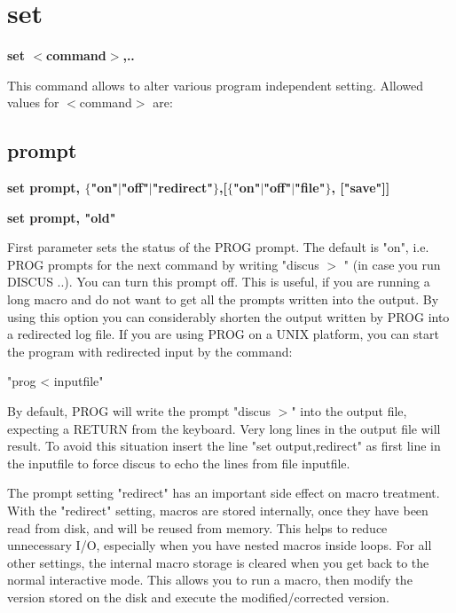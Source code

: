 \section{set}
{\bf set $ <$command$> $,.. \par }
\par
\vspace{3pt}
This command allows to alter various program independent setting. 
Allowed values for $ <$command$> $ are: 
\par
\subsection*{prompt}
{\bf set prompt, $ \{$"on"$| $"off"$| $"redirect"$\} $,[$ \{$"on"$| $"off"$| $"file"$\} $, ["save"]] \par }
{\bf set prompt, "old" \par }
\par
\vspace{3pt}
First parameter sets the status of the PROG prompt. The default is 
"on", i.e. PROG prompts for the next command by writing "discus $> $ " 
(in case you run DISCUS ..). You can turn this prompt off. This is 
useful, if you are running a long macro and do not 
want to get all the prompts written into the output. By using this 
option you can considerably shorten the output written by PROG into a 
redirected log file. If you are using PROG on a UNIX platform, you can 
start the program with redirected input by the command: 
\par
\begin{MacVerbatim}
"prog < inputfile"
\end{MacVerbatim}
By default, PROG will write the prompt "discus $> $" into the output file, 
expecting a RETURN from the keyboard. Very long lines in the output file 
will result. To avoid this situation insert the line "set output,redirect" 
as first line in the inputfile to force discus to echo the lines from file 
inputfile. 
\par
The prompt setting "redirect" has an important side effect on macro 
treatment. With the "redirect" setting, macros are stored internally, 
once they have been read from disk, and will be reused from memory. This 
helps to reduce unnecessary I/O, especially when you have nested macros 
inside loops. For all other settings, the internal macro storage is 
cleared when you get back to the normal interactive mode. This allows 
you to run a macro, then modify the version stored on the disk and 
execute the modified/corrected version. 
